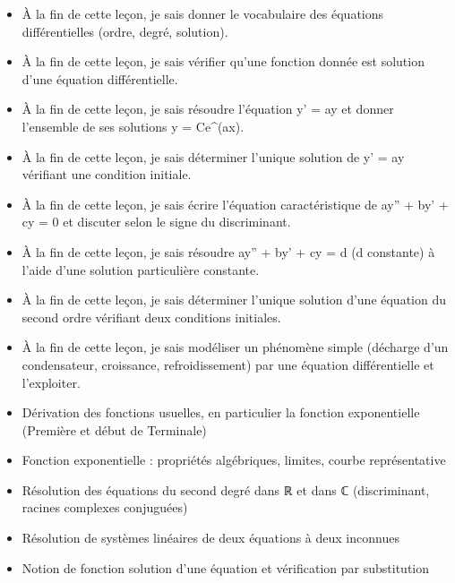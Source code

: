 \documentclass[11pt]{article}
\begin{document}
\begin{objectifs}
\begin{itemize}
\item À la fin de cette leçon, je sais donner le vocabulaire des équations différentielles (ordre, degré, solution).
\item À la fin de cette leçon, je sais vérifier qu'une fonction donnée est solution d'une équation différentielle.
\item À la fin de cette leçon, je sais résoudre l'équation y' = ay et donner l'ensemble de ses solutions y = Ce\^{}(ax).
\item À la fin de cette leçon, je sais déterminer l'unique solution de y' = ay vérifiant une condition initiale.
\item À la fin de cette leçon, je sais écrire l'équation caractéristique de ay'' + by' + cy = 0 et discuter selon le signe du discriminant.
\item À la fin de cette leçon, je sais résoudre ay'' + by' + cy = d (d constante) à l'aide d'une solution particulière constante.
\item À la fin de cette leçon, je sais déterminer l'unique solution d'une équation du second ordre vérifiant deux conditions initiales.
\item À la fin de cette leçon, je sais modéliser un phénomène simple (décharge d'un condensateur, croissance, refroidissement) par une équation différentielle et l'exploiter.
\end{itemize}
\end{objectifs}

\begin{prerequis}
\begin{itemize}
\item Dérivation des fonctions usuelles, en particulier la fonction exponentielle (Première et début de Terminale)
\item Fonction exponentielle : propriétés algébriques, limites, courbe représentative
\item Résolution des équations du second degré dans ℝ et dans ℂ (discriminant, racines complexes conjuguées)
\item Résolution de systèmes linéaires de deux équations à deux inconnues
\item Notion de fonction solution d'une équation et vérification par substitution
\end{itemize}
\end{prerequis}

\newpage
\end{document}
